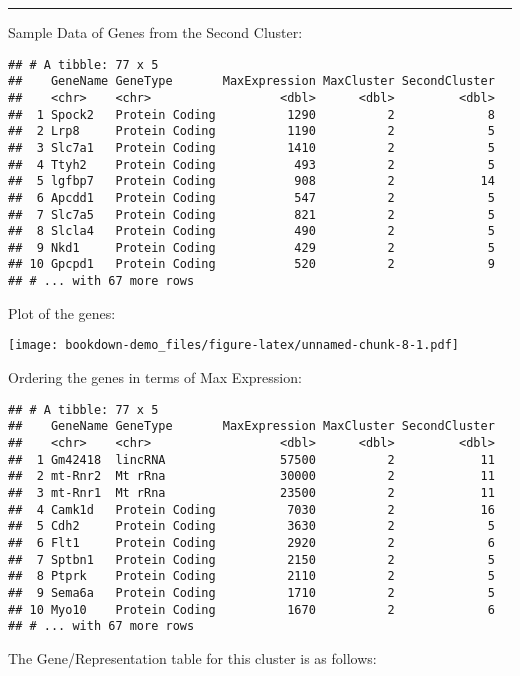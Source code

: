 \documentclass[
]{book}
\begin{document}
\begin{center}\rule{0.5\linewidth}{0.5pt}\end{center}

Sample Data of Genes from the Second Cluster:

\begin{verbatim}
## # A tibble: 77 x 5
##    GeneName GeneType       MaxExpression MaxCluster SecondCluster
##    <chr>    <chr>                  <dbl>      <dbl>         <dbl>
##  1 Spock2   Protein Coding          1290          2             8
##  2 Lrp8     Protein Coding          1190          2             5
##  3 Slc7a1   Protein Coding          1410          2             5
##  4 Ttyh2    Protein Coding           493          2             5
##  5 lgfbp7   Protein Coding           908          2            14
##  6 Apcdd1   Protein Coding           547          2             5
##  7 Slc7a5   Protein Coding           821          2             5
##  8 Slcla4   Protein Coding           490          2             5
##  9 Nkd1     Protein Coding           429          2             5
## 10 Gpcpd1   Protein Coding           520          2             9
## # ... with 67 more rows
\end{verbatim}

Plot of the genes:

\texttt{[image: bookdown-demo\_files/figure-latex/unnamed-chunk-8-1.pdf]}

Ordering the genes in terms of Max Expression:

\begin{verbatim}
## # A tibble: 77 x 5
##    GeneName GeneType       MaxExpression MaxCluster SecondCluster
##    <chr>    <chr>                  <dbl>      <dbl>         <dbl>
##  1 Gm42418  lincRNA                57500          2            11
##  2 mt-Rnr2  Mt rRna                30000          2            11
##  3 mt-Rnr1  Mt rRna                23500          2            11
##  4 Camk1d   Protein Coding          7030          2            16
##  5 Cdh2     Protein Coding          3630          2             5
##  6 Flt1     Protein Coding          2920          2             6
##  7 Sptbn1   Protein Coding          2150          2             5
##  8 Ptprk    Protein Coding          2110          2             5
##  9 Sema6a   Protein Coding          1710          2             5
## 10 Myo10    Protein Coding          1670          2             6
## # ... with 67 more rows
\end{verbatim}

The Gene/Representation table for this cluster is as follows:
\end{document}

